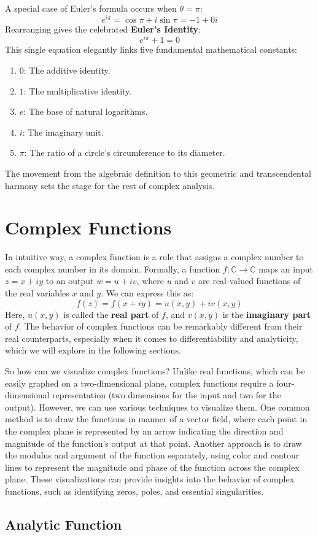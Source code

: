 A special case of Euler's formula occurs when $\theta = \pi$:
\begin{equation}
    e^{i\pi} = \cos \pi + i\sin \pi = -1 + 0i
\end{equation}
Rearranging gives the celebrated \textbf{Euler's Identity}:
\begin{equation}
    e^{i\pi} + 1 = 0
\end{equation}
This single equation elegantly links five fundamental mathematical constants:
\begin{enumerate}
    \item \textbf{$0$}: The additive identity.
    \item \textbf{$1$}: The multiplicative identity.
    \item \textbf{$e$}: The base of natural logarithms.
    \item \textbf{$i$}: The imaginary unit.
    \item \textbf{$\pi$}: The ratio of a circle's circumference to its diameter.
\end{enumerate}
The movement from the algebraic definition to this geometric and transcendental harmony sets the stage for the rest of complex analysis.

\section{Complex Functions}

In intuitive way, a complex function is a rule that assigns a complex number to each complex number in its domain. Formally, a function $f: \mathbb{C} \to \mathbb{C}$ maps an input $z = x + iy$ to an output $w = u + iv$, where $u$ and $v$ are real-valued functions of the real variables $x$ and $y$. We can express this as:
\begin{equation}
    f(z) = f(x + iy) = u(x, y) + iv(x, y)
\end{equation}
Here, $u(x, y)$ is called the \textbf{real part} of $f$, and $v(x, y)$ is the \textbf{imaginary part} of $f$. The behavior of complex functions can be remarkably different from their real counterparts, especially when it comes to differentiability and analyticity, which we will explore in the following sections.

So how can we visualize complex functions? Unlike real functions, which can be easily graphed on a two-dimensional plane, complex functions require a four-dimensional representation (two dimensions for the input and two for the output). However, we can use various techniques to visualize them. One common method is to draw the functions in manner of a vector field, where each point in the complex plane is represented by an arrow indicating the direction and magnitude of the function's output at that point. Another approach is to draw the modulus and argument of the function separately, using color and contour lines to represent the magnitude and phase of the function across the complex plane. These visualizations can provide insights into the behavior of complex functions, such as identifying zeros, poles, and essential singularities.

\subsection{Analytic Function}

